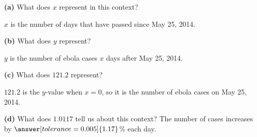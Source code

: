 \documentclass[12pt]{ximera}
\begin{document}
\begin{problem}
\begin{prompt}
\textbf{(a)} What does $x$ represent in this context?
\begin{freeResponse}
\end{freeResponse}
\begin{solution}
$x$ is the number of days that have passed since May 25, 2014.
\end{solution}
\end{prompt}

\begin{prompt}
\textbf{(b)} What does $y$ represent?
\begin{freeResponse}
\end{freeResponse}
\begin{solution}
$y$ is the number of ebola cases $x$ days after May 25, 2014.
\end{solution}
\end{prompt}

\begin{prompt}
\textbf{(c)} What does $121.2$ represent?
\begin{freeResponse}
\end{freeResponse}
\begin{solution}
$121.2$ is the $y$-value when $x = 0$, so it is the number of ebola cases on
May 25, 2014.
\end{solution}
\end{prompt}

\begin{prompt}
\textbf{(d)} What does $1.0117$ tell us about this context? The number of cases
increases by $\answer[tolerance=0.005]{1.17}$\% each day.
\end{prompt}
\end{problem}
\end{document}
